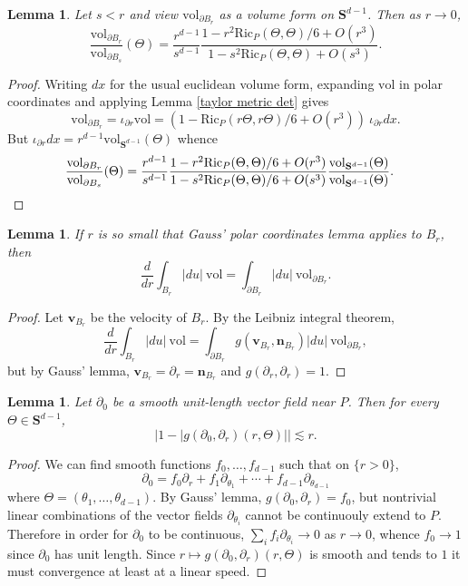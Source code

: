 \documentclass[reqno,12pt,letterpaper]{amsart}
\newcommand{\Sph}{\mathbf S}
\newcommand{\Ric}{\mathrm{Ric}}
\newcommand{\normal}{\mathbf n}
\newcommand{\vol}{\mathrm{vol}}
\newtheorem{lemma}[theorem]{Lemma}
\theoremstyle{definition}
\numberwithin{equation}{section}
\begin{document}
\begin{lemma}\label{rescale the sphere form}
Let $s < r$ and view $\vol_{\partial B_r}$ as a volume form on $\Sph^{d - 1}$.
Then as $r \to 0$,
$$\frac{\vol_{\partial B_r}}{\vol_{\partial B_s}}(\Theta) = \frac{r^{d - 1}}{s^{d - 1}} \frac{1 - r^2 \Ric_P(\Theta, \Theta)/6 + O(r^3)}{1 - s^2 \Ric_P(\Theta, \Theta) + O(s^3)}.$$
\end{lemma}
\begin{proof}
Writing $dx$ for the usual euclidean volume form, expanding $\vol$ in polar coordinates and applying Lemma \ref{taylor metric det} gives
$$\vol_{\partial B_r} = \iota_{\partial r} \vol = (1 - \Ric_P(r\Theta, r\Theta)/6 + O(r^3)) ~\iota_{\partial r} dx.$$
But $\iota_{\partial r} dx = r^{d - 1} \vol_{\Sph^{d - 1}}(\Theta)$ whence
\begin{align*}
\frac{\vol_{\partial B_r}}{\vol_{\partial B_s}}(\Theta) &= \frac{r^{d - 1}}{s^{d - 1}} \frac{1 - r^2 \Ric_P(\Theta, \Theta)/6 + O(r^3)}{1 - s^2 \Ric_P(\Theta, \Theta)/6 +
O(s^3)} \frac{\vol_{\Sph^{d - 1}}(\Theta)}{\vol_{\Sph^{d - 1}}(\Theta)}. \qedhere
\end{align*}
\end{proof}

\begin{lemma}\label{GaussLeibniz}
If $r$ is so small that Gauss' polar coordinates lemma applies to $B_r$, then
$$\frac{d}{dr} \int_{B_r} |du| ~\vol = \int_{\partial B_r} |du| ~\vol_{\partial B_r}.$$
\end{lemma}
\begin{proof}
Let $\mathbf v_{B_r}$ be the velocity of $B_r$.
By the Leibniz integral theorem,
$$\frac{d}{dr} \int_{B_r} |du| ~\vol = \int_{\partial B_r} g(\mathbf v_{B_r}, \normal_{B_r}) |du| ~\vol_{\partial B_r},$$
but by Gauss' lemma, $\mathbf v_{B_r} = \partial_r = \normal_{B_r}$ and $g(\partial_r, \partial_r) = 1$.
\end{proof}

\begin{lemma}\label{quasiradial}
Let $\partial_0$ be a smooth unit-length vector field near $P$. Then for every $\Theta \in \Sph^{d - 1}$,
\begin{equation}\label{quasiradial claim}
|1 - |g(\partial_0, \partial_r)(r, \Theta)|| \lesssim r.
\end{equation}
\end{lemma}
\begin{proof}
We can find smooth functions $f_0, \dots, f_{d - 1}$ such that on $\{r > 0\}$,
$$\partial_0 = f_0 \partial_r + f_1 \partial_{\theta_1} + \cdots + f_{d - 1} \partial_{\theta_{d - 1}}$$
where $\Theta = (\theta_1, \dots, \theta_{d - 1})$.
By Gauss' lemma, $g(\partial_0, \partial_r) = f_0$, but nontrivial linear combinations of the vector fields $\partial_{\theta_i}$ cannot be continuouly extend to $P$.
Therefore in order for $\partial_0$ to be continuous, $\sum_i f_i \partial_{\theta_i} \to 0$ as $r \to 0$, whence $f_0 \to 1$ since $\partial_0$ has unit length.
Since $r \mapsto g(\partial_0, \partial_r)(r, \Theta)$ is smooth and tends to $1$ it must convergence at least at a linear speed.
\end{proof}
\end{document}
